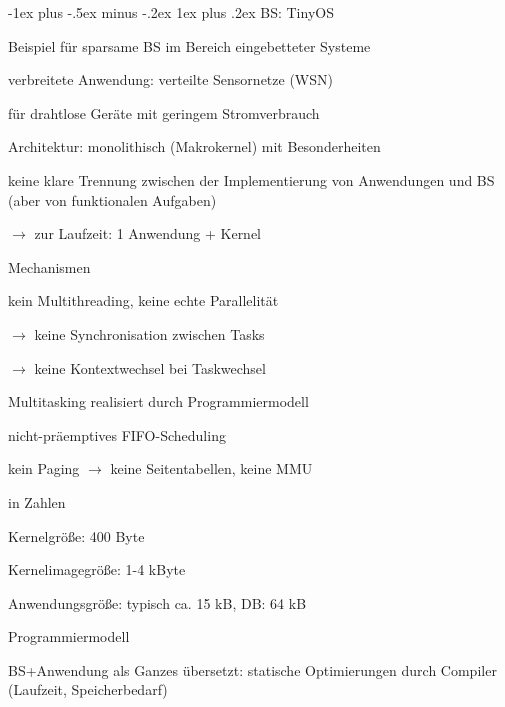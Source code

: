 \documentclass[a4paper]{article}
\makeatletter
\renewcommand{\subsubsection}{\@startsection{subsubsection}{3}{0mm}%
 {-1ex plus -.5ex minus -.2ex}%
 {1ex plus .2ex}%
 {\normalfont\small\bfseries}}
\makeatother
\begin{document}
\begin{multicols}{3}
    \subsubsection{BS: TinyOS}
    \begin{itemize*}
        \item Beispiel für sparsame BS im Bereich eingebetteter Systeme
        \item verbreitete Anwendung: verteilte Sensornetze (WSN)
        \item für drahtlose Geräte mit geringem Stromverbrauch
        \item Architektur: monolithisch (Makrokernel) mit Besonderheiten
        \begin{itemize*}
            \item keine klare Trennung zwischen der Implementierung von Anwendungen und BS (aber von funktionalen Aufgaben)
            \item[$\rightarrow$] zur Laufzeit: 1 Anwendung + Kernel
        \end{itemize*}
        \item Mechanismen
        \begin{itemize*}
            \item kein Multithreading, keine echte Parallelität
            \item[$\rightarrow$] keine Synchronisation zwischen Tasks
            \item[$\rightarrow$] keine Kontextwechsel bei Taskwechsel
            \item Multitasking realisiert durch Programmiermodell
            \item nicht-präemptives FIFO-Scheduling
            \item kein Paging $\rightarrow$ keine Seitentabellen, keine MMU
        \end{itemize*}
        \item in Zahlen
        \begin{itemize*}
            \item Kernelgröße: 400 Byte
            \item Kernelimagegröße: 1-4 kByte
            \item Anwendungsgröße: typisch ca. 15 kB, DB: 64 kB
        \end{itemize*}
        \item Programmiermodell
        \begin{itemize*}
            \item BS+Anwendung als Ganzes übersetzt: statische Optimierungen durch Compiler (Laufzeit, Speicherbedarf)

\end{itemize*}
\end{itemize*}
\end{multicols}
\end{document}
